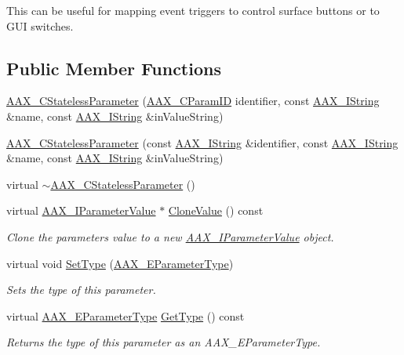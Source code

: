This can be useful for mapping event triggers to control surface buttons or to G\+U\+I switches. \subsection*{Public Member Functions}
\begin{DoxyCompactItemize}
\item 
\hyperlink{a00040_aa3c39b846a18c151d0f2295b0b93050e}{A\+A\+X\+\_\+\+C\+Stateless\+Parameter} (\hyperlink{a00149_a1440c756fe5cb158b78193b2fc1780d1}{A\+A\+X\+\_\+\+C\+Param\+I\+D} identifier, const \hyperlink{a00113}{A\+A\+X\+\_\+\+I\+String} \&name, const \hyperlink{a00113}{A\+A\+X\+\_\+\+I\+String} \&in\+Value\+String)
\item 
\hyperlink{a00040_a84bc019e769c5819095c0448c7bcb0c9}{A\+A\+X\+\_\+\+C\+Stateless\+Parameter} (const \hyperlink{a00113}{A\+A\+X\+\_\+\+I\+String} \&identifier, const \hyperlink{a00113}{A\+A\+X\+\_\+\+I\+String} \&name, const \hyperlink{a00113}{A\+A\+X\+\_\+\+I\+String} \&in\+Value\+String)
\item 
virtual \hyperlink{a00040_a9ec8e91fe24d5c44ed5364c412f367d8}{$\sim$\+A\+A\+X\+\_\+\+C\+Stateless\+Parameter} ()
\item 
virtual \hyperlink{a00109}{A\+A\+X\+\_\+\+I\+Parameter\+Value} $\ast$ \hyperlink{a00040_a6545ae0da58806f69a8338441af53ded}{Clone\+Value} () const 
\begin{DoxyCompactList}\small\item\em Clone the parameter\textquotesingle{}s value to a new \hyperlink{a00109}{A\+A\+X\+\_\+\+I\+Parameter\+Value} object. \end{DoxyCompactList}\item 
virtual void \hyperlink{a00040_af4f8be7d19c554230831d2d48aa2c15a}{Set\+Type} (\hyperlink{a00206_a4cd0f189daa9a60cf36883c56344bb2e}{A\+A\+X\+\_\+\+E\+Parameter\+Type})
\begin{DoxyCompactList}\small\item\em Sets the type of this parameter. \end{DoxyCompactList}\item 
virtual \hyperlink{a00206_a4cd0f189daa9a60cf36883c56344bb2e}{A\+A\+X\+\_\+\+E\+Parameter\+Type} \hyperlink{a00040_a268dae7669ef3993635f3c316566ad25}{Get\+Type} () const 
\begin{DoxyCompactList}\small\item\em Returns the type of this parameter as an A\+A\+X\+\_\+\+E\+Parameter\+Type. \end{DoxyCompactList}\item 

\end{DoxyCompactItemize}
